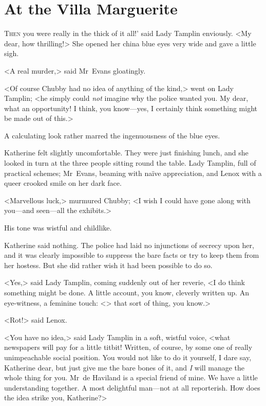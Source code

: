 \chapter{At the Villa Marguerite}



\lettrine[ante=`]{T}{hen}  you were really in the thick of it all!' said Lady Tamplin enviously. <My dear, how thrilling!> She opened her china blue eyes very wide and gave a little sigh.

\zz
<A real murder,> said Mr~Evans gloatingly.

<Of course Chubby had no idea of anything of the kind,> went on Lady Tamplin; <he simply could \emph{not} imagine why the police wanted you. My dear, what an opportunity! I think, you know—yes, I certainly think something might be made out of this.>

A calculating look rather marred the ingenuousness of the blue eyes.

Katherine felt slightly uncomfortable. They were just finishing lunch, and she looked in turn at the three people sitting round the table. Lady Tamplin, full of practical schemes; Mr~Evans, beaming with naïve appreciation, and Lenox with a queer crooked smile on her dark face.

<Marvellous luck,> murmured Chubby; <I wish I could have gone along with you—and seen—all the exhibits.>

His tone was wistful and childlike.

Katherine said nothing. The police had laid no injunctions of secrecy upon her, and it was clearly impossible to suppress the bare facts or try to keep them from her hostess. But she did rather wish it had been possible to do so.

<Yes,> said Lady Tamplin, coming suddenly out of her reverie, <I do think something might be done. A little account, you know, cleverly written up. An eye-witness, a feminine touch: <\longdash> that sort of thing, you know.>

<Rot!> said Lenox.

<You have no idea,> said Lady Tamplin in a soft, wistful voice, <what newspapers will pay for a little titbit! Written, of course, by some one of really unimpeachable social position. You would not like to do it yourself, I dare say, Katherine dear, but just give me the bare bones of it, and \emph{I} will manage the whole thing for you. Mr~de Haviland is a special friend of mine. We have a little understanding together. A most delightful man—not at all reporterish. How does the idea strike you, Katherine?>

